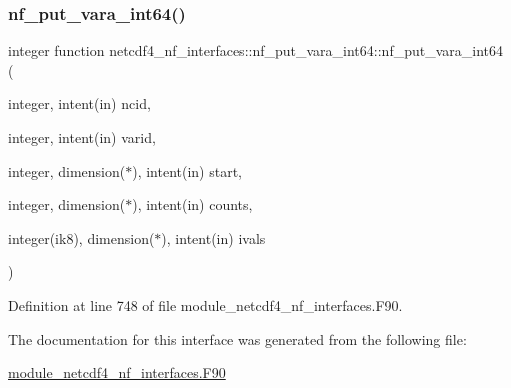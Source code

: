 \subsubsection{\texorpdfstring{nf\+\_\+put\+\_\+vara\+\_\+int64()}{nf\_put\_vara\_int64()}}
{\footnotesize\ttfamily integer function netcdf4\+\_\+nf\+\_\+interfaces\+::nf\+\_\+put\+\_\+vara\+\_\+int64\+::nf\+\_\+put\+\_\+vara\+\_\+int64 (\begin{DoxyParamCaption}\item[{integer, intent(in)}]{ncid,  }\item[{integer, intent(in)}]{varid,  }\item[{integer, dimension($\ast$), intent(in)}]{start,  }\item[{integer, dimension($\ast$), intent(in)}]{counts,  }\item[{integer(ik8), dimension($\ast$), intent(in)}]{ivals }\end{DoxyParamCaption})}



Definition at line 748 of file module\+\_\+netcdf4\+\_\+nf\+\_\+interfaces.\+F90.



The documentation for this interface was generated from the following file\+:\begin{DoxyCompactItemize}
\item 
\hyperlink{module__netcdf4__nf__interfaces_8F90}{module\+\_\+netcdf4\+\_\+nf\+\_\+interfaces.\+F90}\end{DoxyCompactItemize}
